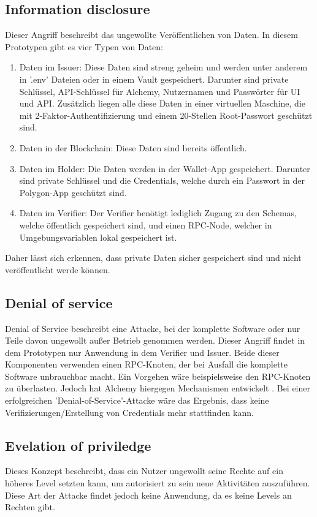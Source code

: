 \subsection{Information disclosure}
\label{disclosure}
Dieser Angriff beschreibt das ungewollte Veröffentlichen von Daten. In diesem Prototypen gibt es vier Typen von Daten:
\begin{enumerate}
	\item Daten im Issuer: Diese Daten sind streng geheim und werden unter anderem in '.env' Dateien oder in einem Vault gespeichert. Darunter sind private Schlüssel, API-Schlüssel für Alchemy, Nutzernamen und Passwörter für UI und API. Zusätzlich liegen alle diese Daten in einer virtuellen Maschine, die mit 2-Faktor-Authentifizierung und einem 20-Stellen Root-Passwort geschützt sind.
	\item Daten in der Blockchain: Diese Daten sind bereits öffentlich.
	\item Daten im Holder: Die Daten werden in der Wallet-App gespeichert. Darunter sind private Schlüssel und die Credentials, welche durch ein Passwort in der Polygon-App geschützt sind.
	\item Daten im Verifier: Der Verifier benötigt lediglich Zugang zu den Schemas, welche öffentlich gespeichert sind, und einen RPC-Node, welcher in Umgebungsvariablen lokal gespeichert ist.
\end{enumerate}
Daher lässt sich erkennen, dass private Daten sicher gespeichert sind und nicht veröffentlicht werde können.

\subsection{Denial of service}
Denial of Service beschreibt eine Attacke, bei der komplette Software oder nur Teile davon ungewollt außer Betrieb genommen werden. Dieser Angriff findet in dem Prototypen nur Anwendung in dem Verifier und Issuer. Beide dieser Komponenten verwenden einen RPC-Knoten, der bei Ausfall die komplette Software unbrauchbar macht. Ein Vorgehen wäre beispielsweise den RPC-Knoten zu überlasten. Jedoch hat Alchemy hiergegen Mechanismen entwickelt \cite{ID61}. Bei einer erfolgreichen 'Denial-of-Service'-Attacke wäre das Ergebnis, dass keine Verifizierungen/Erstellung von Credentials mehr stattfinden kann.

\subsection{Evelation of priviledge}
Dieses Konzept beschreibt, dass ein Nutzer ungewollt seine Rechte auf ein höheres Level setzten kann, um autorisiert zu sein neue Aktivitäten auszuführen. Diese Art der Attacke findet jedoch keine Anwendung, da es keine Levels an Rechten gibt.


